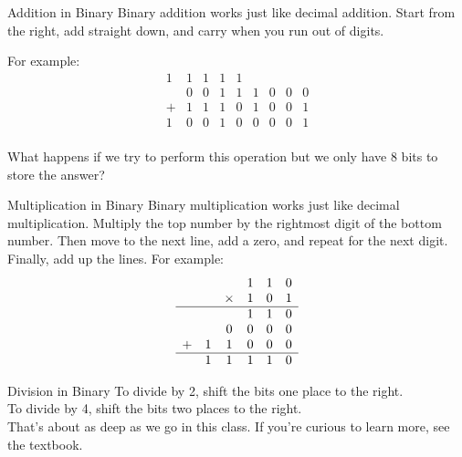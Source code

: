 \begin{frame}{Addition in Binary}
    Binary addition works just like decimal addition.
    Start from the right, add straight down, and carry when you run out of digits.

    For example:
    \[
        \begin{array}{ccccccccc}
            1 & 1 & 1 & 1 & 1 &   &   &   &   \\
              & 0 & 0 & 1 & 1 & 1 & 0 & 0 & 0 \\
            + & 1 & 1 & 1 & 0 & 1 & 0 & 0 & 1 \\
            \hline
            1 & 0 & 0 & 1 & 0 & 0 & 0 & 0 & 1 \\
        \end{array}
    \]

    What happens if we try to perform this operation but we only have 8 bits to
    store the answer?
\end{frame}

\begin{frame}{Multiplication in Binary}
    Binary multiplication works just like decimal multiplication.
    Multiply the top number by the rightmost digit of the bottom number.
    Then move to the next line, add a zero, and repeat for the next digit.
    Finally, add up the lines. For example:
    \[
        \begin{array}{cccccc}
              &   &        & 1 & 1 & 0 \\
              &   & \times & 1 & 0 & 1 \\
            \hline
              &   &        & 1 & 1 & 0 \\
              &   & 0      & 0 & 0 & 0 \\
            + & 1 & 1      & 0 & 0 & 0 \\
            \hline
              & 1 & 1      & 1 & 1 & 0 \\
        \end{array}
    \]
\end{frame}

\begin{frame}{Division in Binary}
    To divide by 2, shift the bits one place to the right. \\

    To divide by 4, shift the bits two places to the right. \\

    That's about as deep as we go in this class. If you're curious to learn more,
    see the textbook.

\end{frame}

